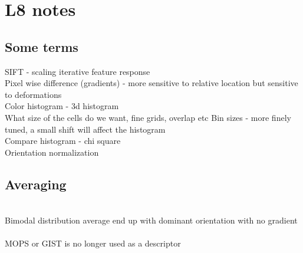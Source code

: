 \documentclass[11pt]{article}
\begin{document}
\section*{L8 notes}
\subsection*{Some terms}
SIFT - scaling iterative feature response\\
Pixel wise difference (gradients) - more sensitive to relative location but sensitive to deformations
\\
Color histogram - 3d histogram \\
What size of the cells do we want, fine grids, overlap etc
Bin sizes - more finely tuned, a small shift will affect the histogram
\\
Compare histogram - chi square
\\
Orientation normalization\\
\subsection*{Averaging}\\
Bimodal distribution average end up with dominant orientation with no gradient\\\\
MOPS or GIST is no longer used as a descriptor\\
\\\\
\end{document}
